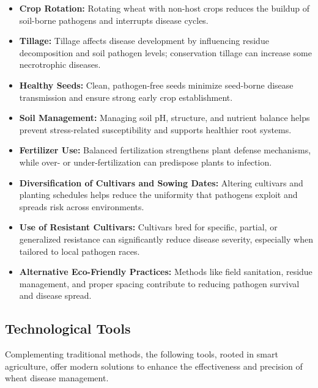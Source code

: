 \begin{itemize}
    \item \textbf{Crop Rotation:} Rotating wheat with non-host crops reduces the buildup of soil-borne pathogens and interrupts disease cycles.
    \item \textbf{Tillage:} Tillage affects disease development by influencing residue decomposition and soil pathogen levels; conservation tillage can increase some necrotrophic diseases.
    \item \textbf{Healthy Seeds:} Clean, pathogen-free seeds minimize seed-borne disease transmission and ensure strong early crop establishment.
    \item \textbf{Soil Management:} Managing soil pH, structure, and nutrient balance helps prevent stress-related susceptibility and supports healthier root systems.
    \item \textbf{Fertilizer Use:} Balanced fertilization strengthens plant defense mechanisms, while over- or under-fertilization can predispose plants to infection.
    \item \textbf{Diversification of Cultivars and Sowing Dates:} Altering cultivars and planting schedules helps reduce the uniformity that pathogens exploit and spreads risk across environments.
    \item \textbf{Use of Resistant Cultivars:} Cultivars bred for specific, partial, or generalized resistance can significantly reduce disease severity, especially when tailored to local pathogen races.
    \item \textbf{Alternative Eco-Friendly Practices:} Methods like field sanitation, residue management, and proper spacing contribute to reducing pathogen survival and disease spread.
\end{itemize}

\subsection{Technological Tools}
Complementing traditional methods, the following tools, rooted in smart agriculture, offer modern solutions to enhance the effectiveness and precision of wheat disease management.

